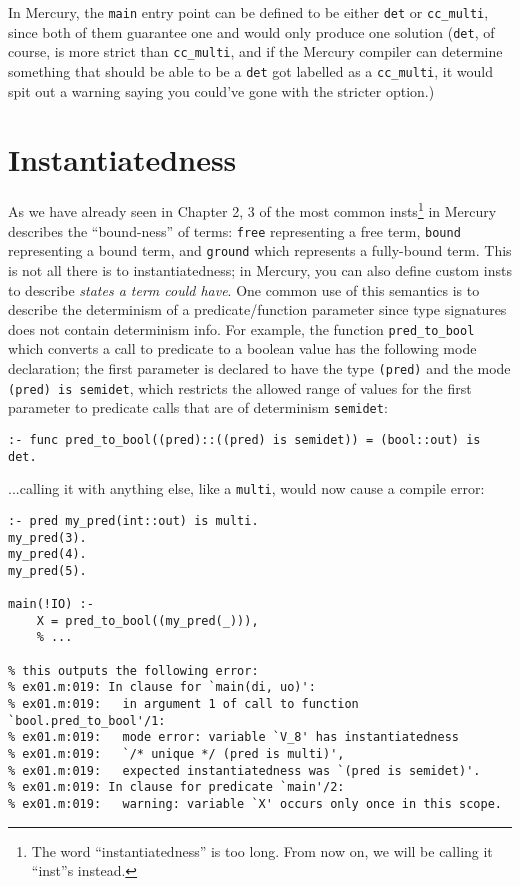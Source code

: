 In Mercury, the \texttt{main} entry point can be defined to be either \texttt{det} or \texttt{cc\_multi}, since both of them guarantee one and would only produce one solution (\texttt{det}, of course, is more strict than \texttt{cc\_multi}, and if the Mercury compiler can determine something that should be able to be a \texttt{det} got labelled as a \texttt{cc\_multi}, it would spit out a warning saying you could've gone with the stricter option.)

\section{Instantiatedness}

As we have already seen in Chapter 2, 3 of the most common insts\footnote{The word ``instantiatedness'' is too long. From now on, we will be calling it ``inst''s instead.} in Mercury describes the ``bound-ness'' of terms: \texttt{free} representing a free term, \texttt{bound} representing a bound term, and \texttt{ground} which represents a fully-bound term. This is not all there is to instantiatedness; in Mercury, you can also define custom insts to describe \textit{states a term could have}. One common use of this semantics is to describe the determinism of a predicate/function parameter since type signatures does not contain determinism info. For example, the function \texttt{pred_to_bool} which converts a call to predicate to a boolean value has the following mode declaration; the first parameter is declared to have the type \texttt{(pred)} and the
mode \texttt{(pred) is semidet}, which restricts the allowed range of values for the first parameter to predicate calls that are of determinism \texttt{semidet}:

\begin{lstlisting}[language=Mercury]
:- func pred_to_bool((pred)::((pred) is semidet)) = (bool::out) is det.
\end{lstlisting}

...calling it with anything else, like a \texttt{multi}, would now cause a compile error:

\begin{lstlisting}[language=Mercury]
:- pred my_pred(int::out) is multi.
my_pred(3).
my_pred(4).
my_pred(5).

main(!IO) :-
	X = pred_to_bool((my_pred(_))),
    % ...

% this outputs the following error:
% ex01.m:019: In clause for `main(di, uo)':
% ex01.m:019:   in argument 1 of call to function `bool.pred_to_bool'/1:
% ex01.m:019:   mode error: variable `V_8' has instantiatedness
% ex01.m:019:   `/* unique */ (pred is multi)',
% ex01.m:019:   expected instantiatedness was `(pred is semidet)'.
% ex01.m:019: In clause for predicate `main'/2:
% ex01.m:019:   warning: variable `X' occurs only once in this scope.
\end{lstlisting}

